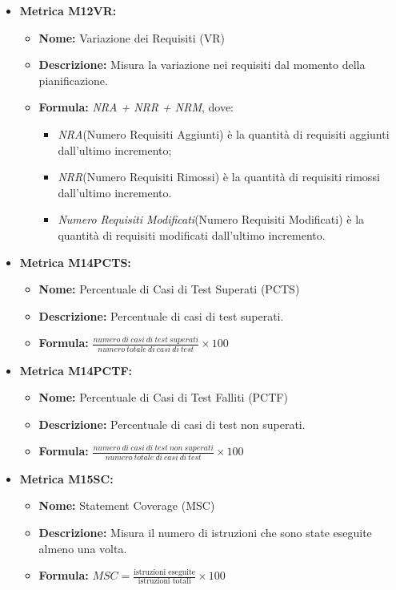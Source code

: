 \begin{itemize}
    \item \textbf{Metrica M12VR:}
          \begin{itemize}
              \item \textbf{Nome:} Variazione dei Requisiti (VR)
              \item \textbf{Descrizione:} Misura la variazione nei requisiti dal momento della pianificazione.
              \item \textbf{Formula:} \textit{NRA + NRR + NRM}, dove:\begin{itemize}
                \item \textit{NRA}(Numero Requisiti Aggiunti) è la quantità di requisiti aggiunti dall'ultimo incremento;
                \item \textit{NRR}(Numero Requisiti Rimossi) è la quantità di requisiti rimossi dall'ultimo incremento.
                \item \textit{Numero Requisiti Modificati}(Numero Requisiti Modificati) è la quantità di requisiti modificati dall'ultimo incremento.
              \end{itemize}
          \end{itemize}
    
    \item \textbf{Metrica M14PCTS:}
          \begin{itemize}
           \item \textbf{Nome:} Percentuale di Casi di Test Superati (PCTS)
           \item \textbf{Descrizione:} Percentuale di casi di test superati.
           \item \textbf{Formula:} $\frac{numero \ di \ casi \ di \ test \ superati}{numero \ totale \ di \ casi \ di \ test}\times 100$
          \end{itemize}

    \item \textbf{Metrica M14PCTF:}
          \begin{itemize}
           \item \textbf{Nome:} Percentuale di Casi di Test Falliti (PCTF)
           \item \textbf{Descrizione:} Percentuale di casi di test non superati.
           \item \textbf{Formula:} $\frac{numero \ di \ casi \ di \ test \ non \ superati}{numero \ totale \ di \ casi \ di \ test}\times 100$
          \end{itemize}

          \item \textbf{Metrica M15SC:}
          \begin{itemize}
              \item \textbf{Nome:} Statement Coverage (MSC)
              \item \textbf{Descrizione:} Misura il numero di istruzioni che sono state eseguite almeno una volta.
              \item \textbf{Formula:} $MSC = \frac{\text{istruzioni eseguite}}{\text{istruzioni totali}} \times 100$
          \end{itemize}


\end{itemize}
